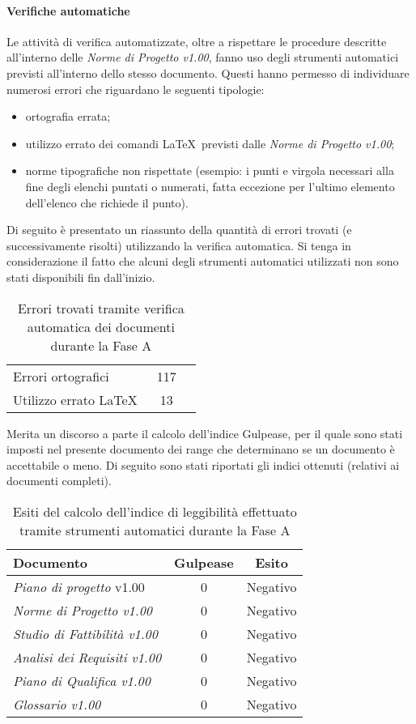 \documentclass[../PianoDiQualifica.tex]{subfiles}
\begin{document}
\begin{appendices}
			\paragraph{Verifiche automatiche}
			Le attività di verifica automatizzate, oltre a rispettare le procedure descritte all'interno delle \textit{Norme di Progetto v1.00}, fanno uso degli strumenti automatici previsti all'interno dello stesso documento. Questi hanno permesso di individuare numerosi errori che riguardano le seguenti tipologie:
			\begin{itemize}
				\item ortografia errata;
				\item utilizzo errato dei comandi \LaTeX\ previsti dalle \textit{Norme di Progetto v1.00};
				\item norme tipografiche non rispettate (esempio: i punti e virgola necessari alla fine degli elenchi puntati o numerati, fatta eccezione per l'ultimo elemento dell'elenco che richiede il punto).
			\end{itemize}
			Di seguito è presentato un riassunto della quantità di errori trovati (e successivamente risolti) utilizzando la verifica automatica. Si tenga in considerazione il fatto che alcuni degli strumenti automatici utilizzati non sono stati disponibili fin dall'inizio.
\begin{table}[H]
		\centering
		\begin{tabular}{l * {2}{c}}
			\midrule
			Errori ortografici &	117 \\
			Utilizzo errato \LaTeX \ & 13 \\
			\midrule
		\end{tabular}
		\caption{Errori trovati tramite verifica automatica dei documenti durante la Fase A}
		\label{tab:errori_automatica}
\end{table}	
			Merita un discorso a parte il calcolo dell'indice Gulpease, per il quale sono stati imposti nel presente documento dei range che determinano se un documento è accettabile o meno. Di seguito sono stati riportati gli indici ottenuti (relativi ai documenti completi).
\begin{table}[H]
		\centering
		\begin{tabular}{l * {2}{c}}
			\toprule
			\textbf{Documento} & \textbf{Gulpease} & \textbf{Esito} \\
			\midrule
			\textit{Piano di progetto} v1.00 & 0 &  Negativo \\
			\textit{Norme di Progetto v1.00} & 0 & Negativo \\
			\textit{Studio di Fattibilità v1.00} & 0 & Negativo \\
			\textit{Analisi dei Requisiti v1.00} & 0 & Negativo \\
			\textit{Piano di Qualifica v1.00} & 0 & Negativo \\
			\textit{Glossario v1.00} & 0 & Negativo \\
			\bottomrule
		\end{tabular}
		\caption{Esiti del calcolo dell’indice di leggibilità effettuato tramite strumenti automatici durante la Fase A}
		\label{tab:esiti_gulpease}
\end{table}

\end{appendices}
\end{document}
